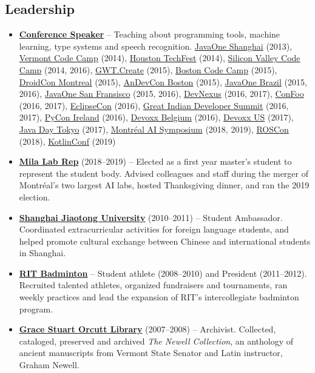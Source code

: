 \documentclass[letterpaper,11pt]{article}
\newcommand{\resumeItem}[2]{
\item\small{
\textbf{#1}{ #2 \vspace{-2pt}}
}
}
\newcommand{\resumeSubItem}[2]{\resumeItem{#1}{#2}}
\newcommand{\resumeSubHeadingListStart}{\begin{itemize}[leftmargin=*]}
\newcommand{\resumeSubHeadingListEnd}{\end{itemize}}
\begin{document}
\begin{justify}
\section{Leadership}
\resumeSubHeadingListStart
\resumeSubItem{\href{https://speakerdeck.com/breandan}{Conference Speaker}} {-- Teaching about programming tools, machine learning, type systems and speech recognition.
\href{https://oracle.com/javaone}{JavaOne Shanghai} (2013),
\href{https://www.vtcodecamp.org/}{Vermont Code Camp} (2014),
\href{http://houstontechfest.com/}{Houston TechFest} (2014),
\href{https://svcc.mobi/}{Silicon Valley Code Camp} (2014, 2016),
\href{http://gwtcreate.com/}{GWT.Create} (2015),
\href{https://www.bostoncodecamp.com/}{Boston Code Camp} (2015),
\href{https://www.droidcon.com/}{DroidCon Montreal} (2015),
\href{http://www.andevcon.com/}{AnDevCon Boston} (2015),
\href{https://oracle.com/javaone}{JavaOne Brazil} (2015, 2016),
\href{https://oracle.com/javaone}{JavaOne San Fransisco} (2015, 2016),
\href{https://devnexus.com/}{DevNexus} (2016, 2017),
\href{https://confoo.ca}{ConFoo} (2016, 2017),
\href{https://www.eclipsecon.org/na2016}{EclipseCon} (2016),
\href{https://www.developersummit.com/}{Great Indian Developer Summit} (2016, 2017),
\href{https://python.ie}{PyCon Ireland} (2016),
\href{https://devoxx.com/}{Devoxx Belgium} (2016),
\href{https://devoxx.com/}{Devoxx US} (2017),
\href{https://www.oracle.co.jp/events/javaday/2017/}{Java Day Tokyo} (2017),
\href{http://montrealaisymposium.com/}{Montr\'eal AI Symposium} (2018, 2019),
\href{https://roscon.ros.org}{ROSCon} (2018),
\href{https://kotlinconf.com/}{KotlinConf} (2019)
}
\resumeSubItem{\href{https://mila.quebec/}{Mila Lab Rep}} {(2018--2019) -- Elected as a first year master's student to represent the student body. Advised colleagues and staff during the merger of Montr\'eal's two largest AI labs, hosted Thanksgiving dinner, and ran the 2019 election.}
\resumeSubItem{\href{https://www.sjtu.edu.cn/}{Shanghai Jiaotong University}} {(2010--2011) -- Student Ambassador. Coordinated extracurricular activities for foreign language students, and helped promote cultural exchange between Chinese and international students in Shanghai.}
\resumeSubItem{\href{https://www.rit.edu/sg/badminton/}{RIT Badminton}} {-- Student athlete (2008--2010) and President (2011--2012). Recruited talented athletes, organized fundraisers and tournaments, ran weekly practices and lead the expansion of RIT's intercollegiate badminton program.}
\resumeSubItem{\href{https://www.stjacademy.org/academics/library}{Grace Stuart Orcutt Library}} {(2007--2008) -- Archivist. Collected, cataloged, preserved and archived \textit{The Newell Collection}, an anthology of ancient manuscripts from Vermont State Senator and Latin instructor, Graham Newell.}
\resumeSubHeadingListEnd


\end{justify}
\end{document}
